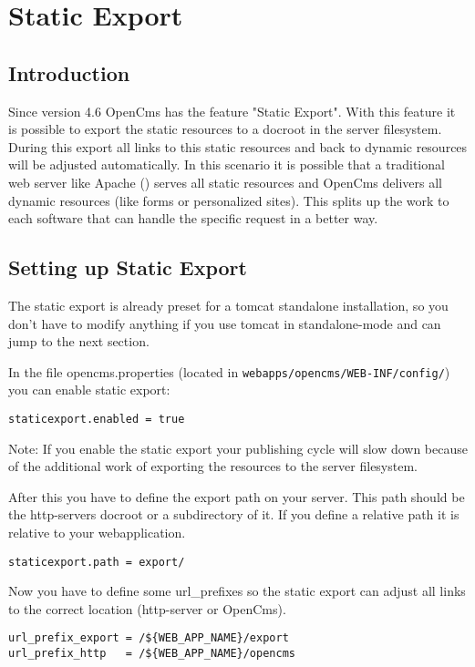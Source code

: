 \chapter{Static Export}

\section{Introduction}

Since version 4.6 OpenCms has the feature "Static Export". With this feature it is possible to export the static resources to a docroot in the server filesystem. During this export all links to this static resources and back to dynamic resources will be adjusted automatically. In this scenario it is possible that a traditional web server like Apache () serves all static resources and OpenCms delivers all dynamic resources (like forms or personalized sites). This splits up the work to each software that can handle the specific request in a better way.

\section{Setting up Static Export}

The static export is already preset for a tomcat standalone installation, so you don't have to modify anything if you use tomcat in standalone-mode and can jump to the next section.

In the file opencms.properties (located in \texttt{webapps/opencms/WEB-INF/config/}) you can enable static export:

\texttt{staticexport.enabled = true}

Note: If you enable the static export your publishing cycle will slow down because of the additional work of exporting the resources to the server filesystem.

After this you have to define the export path on your server. This path should be the http-servers docroot or a subdirectory of it. If you define a relative path it is relative to your webapplication.

\texttt{staticexport.path = export/}

Now you have to define some url\_prefixes so the static export can adjust all links to the correct location (http-server or OpenCms).

\begin{verbatim}
url_prefix_export = /${WEB_APP_NAME}/export
url_prefix_http   = /${WEB_APP_NAME}/opencms
\end{verbatim}

